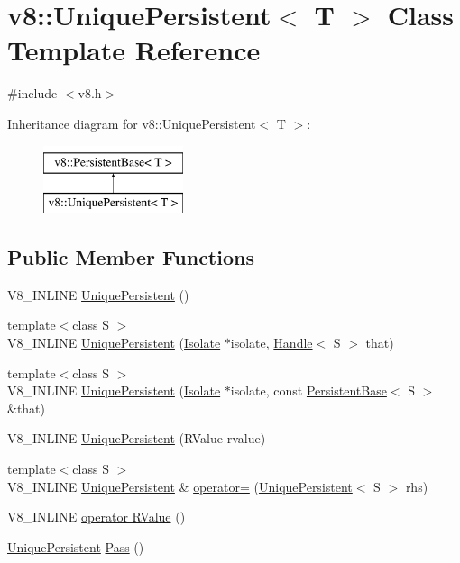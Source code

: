 \hypertarget{classv8_1_1UniquePersistent}{}\section{v8\+:\+:Unique\+Persistent$<$ T $>$ Class Template Reference}
\label{classv8_1_1UniquePersistent}


{\ttfamily \#include $<$v8.\+h$>$}

Inheritance diagram for v8\+:\+:Unique\+Persistent$<$ T $>$\+:\begin{figure}[H]
\begin{center}
\leavevmode
\includegraphics[height=2.000000cm]{classv8_1_1UniquePersistent}
\end{center}
\end{figure}
\subsection*{Public Member Functions}
\begin{DoxyCompactItemize}
\item 
V8\+\_\+\+I\+N\+L\+I\+N\+E \hyperlink{classv8_1_1UniquePersistent_adab1460f2350842ea97e9ac63b3b3692}{Unique\+Persistent} ()
\item 
{\footnotesize template$<$class S $>$ }\\V8\+\_\+\+I\+N\+L\+I\+N\+E \hyperlink{classv8_1_1UniquePersistent_af7dbba9e4b73104d0a1950c215426a57}{Unique\+Persistent} (\hyperlink{classv8_1_1Isolate}{Isolate} $\ast$isolate, \hyperlink{classv8_1_1Handle}{Handle}$<$ S $>$ that)
\item 
{\footnotesize template$<$class S $>$ }\\V8\+\_\+\+I\+N\+L\+I\+N\+E \hyperlink{classv8_1_1UniquePersistent_a795e5299871d11469dc2e1c637eb76fa}{Unique\+Persistent} (\hyperlink{classv8_1_1Isolate}{Isolate} $\ast$isolate, const \hyperlink{classv8_1_1PersistentBase}{Persistent\+Base}$<$ S $>$ \&that)
\item 
V8\+\_\+\+I\+N\+L\+I\+N\+E \hyperlink{classv8_1_1UniquePersistent_a73c1edaf902755a71c1236f91388ef5a}{Unique\+Persistent} (R\+Value rvalue)
\item 
{\footnotesize template$<$class S $>$ }\\V8\+\_\+\+I\+N\+L\+I\+N\+E \hyperlink{classv8_1_1UniquePersistent}{Unique\+Persistent} \& \hyperlink{classv8_1_1UniquePersistent_aa533c3aff16091f332a0f892a658e70c}{operator=} (\hyperlink{classv8_1_1UniquePersistent}{Unique\+Persistent}$<$ S $>$ rhs)
\item 
V8\+\_\+\+I\+N\+L\+I\+N\+E \hyperlink{classv8_1_1UniquePersistent_a06e8c1c5be0b982a02e48e81df0b9794}{operator R\+Value} ()
\item 
\hyperlink{classv8_1_1UniquePersistent}{Unique\+Persistent} \hyperlink{classv8_1_1UniquePersistent_ace8f7fa76e5d36afd3ae8ee94acff00f}{Pass} ()
\end{DoxyCompactItemize}


